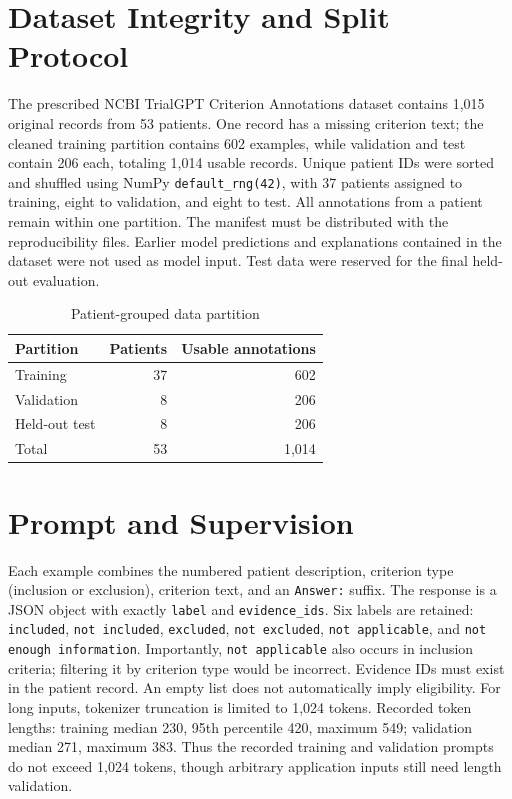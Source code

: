 \documentclass[conference]{IEEEtran}
\begin{document}
\section{Dataset Integrity and Split Protocol}
The prescribed NCBI TrialGPT Criterion Annotations dataset contains 1,015 original records from 53 patients. One record has a missing criterion text; the cleaned training partition contains 602 examples, while validation and test contain 206 each, totaling 1,014 usable records. Unique patient IDs were sorted and shuffled using NumPy \texttt{default\_rng(42)}, with 37 patients assigned to training, eight to validation, and eight to test. All annotations from a patient remain within one partition. The manifest must be distributed with the reproducibility files. Earlier model predictions and explanations contained in the dataset were not used as model input. Test data were reserved for the final held-out evaluation.
\begin{table}[!t]\centering\caption{Patient-grouped data partition}\begin{tabular}{lrr}\toprule Partition&Patients&Usable annotations\\\midrule Training&37&602\\Validation&8&206\\Held-out test&8&206\\\midrule Total&53&1,014\\\bottomrule\end{tabular}\end{table}
\section{Prompt and Supervision}
Each example combines the numbered patient description, criterion type (inclusion or exclusion), criterion text, and an \texttt{Answer:} suffix. The response is a JSON object with exactly \texttt{label} and \texttt{evidence\_ids}. Six labels are retained: \texttt{included}, \texttt{not included}, \texttt{excluded}, \texttt{not excluded}, \texttt{not applicable}, and \texttt{not enough information}. Importantly, \texttt{not applicable} also occurs in inclusion criteria; filtering it by criterion type would be incorrect. Evidence IDs must exist in the patient record. An empty list does not automatically imply eligibility. For long inputs, tokenizer truncation is limited to 1,024 tokens. Recorded token lengths: training median 230, 95th percentile 420, maximum 549; validation median 271, maximum 383. Thus the recorded training and validation prompts do not exceed 1,024 tokens, though arbitrary application inputs still need length validation.
\end{document}
